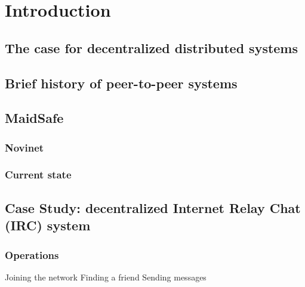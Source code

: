 \chapter{Introduction}

\section{The case for decentralized distributed systems}

\section{Brief history of peer-to-peer systems}

\section{MaidSafe}

\subsection{Novinet}

\subsection{Current state}

\section{Case Study: decentralized Internet Relay Chat (IRC) system}

\subsection{Operations}
Joining the network
Finding a friend
Sending messages